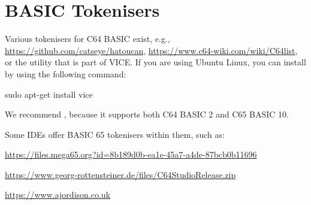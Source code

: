 \chapter{BASIC Tokenisers}

Various tokenisers for C64 BASIC exist, e.g., \url{https://github.com/catseye/hatoucan},
\url{https://www.c64-wiki.com/wiki/C64list}, or the  utility that is part of VICE.
If you are using Ubuntu Linux, you can install  by using the following command:

\begin{screenoutput}
sudo apt-get install vice
\end{screenoutput}

We recommend , because it supports both C64 BASIC 2 and C65 BASIC 10.

Some IDEs offer BASIC 65 tokenisers within them, such as:


\url{https://files.mega65.org?id=8b189d0b-ea1e-45a7-a4de-87bcb0b11696}


\url{https://www.georg-rottensteiner.de/files/C64StudioRelease.zip}


\url{https://www.ajordison.co.uk}
